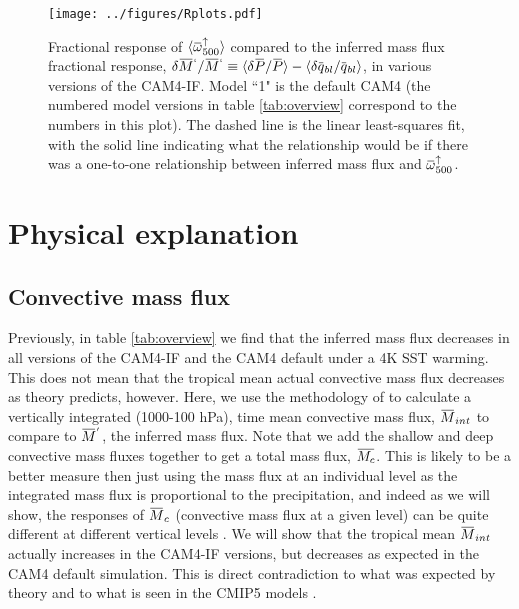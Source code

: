 \documentclass[letterpaper,12pt,titlepage,oneside,final]{book}
\newcommand{\overbar}[1]{\mkern 1.5mu\overline{\mkern-1.5mu#1\mkern-1.5mu}\mkern 1.5mu}
\begin{document}
\begin{figure}[H]
\centering
\noindent\texttt{[image: ../figures/Rplots.pdf]}\hfill
\caption{\footnotesize Fractional response of $\langle\overbar{\omega}_{500}^{\uparrow}\rangle$ compared to the inferred mass flux fractional response, $\delta\overbar{M}^{`}/\overbar{M}^{`} \equiv \langle\delta\overbar{P}/\overbar{P}\rangle - \langle\delta\overbar{q}_{bl}/\overbar{q}_{bl}\rangle$, in various versions of the CAM4-IF. Model ``1" is the default CAM4 (the numbered model versions in table \ref{tab:overview} correspond to the numbers in this plot). The dashed line is the linear least-squares fit, with the solid line indicating what the relationship would be if there was a  one-to-one relationship between inferred mass flux and ${\overbar{\omega}_{500}^{\uparrow}}$.}
\label{fig:vecchi}
\end{figure}

\section{Physical explanation}
\subsection{Convective mass flux}
Previously, in table \ref{tab:overview} we find that the inferred mass flux decreases in all versions of the CAM4-IF and the CAM4 default under a 4K SST warming. This does not mean that the tropical mean actual convective mass flux decreases as theory predicts, however. Here, we use the methodology of \citet{chadwick_spatial_2012} to calculate a vertically integrated (1000-100 hPa), time mean convective mass flux, $\overbar{M}_{int}$ to compare to $\overbar{M}^{'}$, the inferred mass flux. Note that we add the shallow and deep convective mass fluxes together to get a total mass flux, $\overbar{M_{c}}$. This is likely to be a better measure then just using the mass flux at an individual level as the integrated mass flux is proportional to the precipitation, and indeed as we will show, the responses of $\overbar{M}_{c}$ (convective mass flux at a given level) can be quite different at different vertical levels \citep{chadwick_spatial_2012}. We will show that the tropical mean $\overbar{M}_{int}$ actually increases in the CAM4-IF versions, but decreases as expected in the CAM4 default simulation. This is direct contradiction to what was expected by theory \citep{held_robust_2006,vecchi_global_2007} and to what is seen in the CMIP5 models \citep{chadwick_spatial_2012}.
\end{document}
